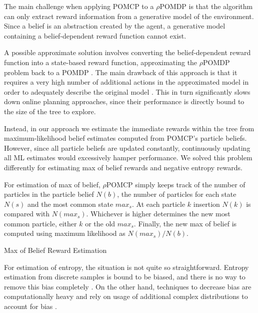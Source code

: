 The main challenge when applying POMCP to a $\rho$POMDP is that the algorithm can only extract
reward information from a generative model of the environment. Since a belief is an abstraction
created by the agent, a generative model containing a belief-dependent reward function cannot exist.

A possible approximate solution involves converting the belief-dependent reward function into a
state-based reward function, approximating the $\rho$POMDP problem back to a POMDP
\cite{cit:rpomdp}.  The main drawback of this approach is that it requires a very high number of
additional actions in the approximated model in order to adequately describe the original model
\cite{cit:pomdpir}. This in turn significantly slows down online planning approaches, since their
performance is directly bound to the size of the tree to explore.

Instead, in our approach we estimate the immediate rewards within the tree from maximum-likelihood
belief estimates computed from POMCP's particle beliefs. However, since all particle beliefs are
updated constantly, continuously updating all ML estimates would excessively hamper performance. We
solved this problem differently for estimating max of belief rewards and negative entropy rewards.

For estimation of max of belief, $\rho$POMCP simply keeps track of the number of particles in the
particle belief $N(b)$, the number of particles for each state $N(s)$ and the most common state
$max_s$. At each particle $k$ insertion $N(k)$ is compared with $N(max_s)$. Whichever is higher
determines the new most common particle, either $k$ or the old $max_s$. Finally, the new max of
belief is computed using maximum likelihood as $N(max_s)/N(b)$.

\begin{algorithm}[H]
    \caption{Max of Belief Reward Estimation}

\end{algorithm}

For estimation of entropy, the situation is not quite so straightforward. Entropy estimation from
discrete samples is bound to be biased, and there is no way to remove this bias completely
\cite{cit:badentropy}. On the other hand, techniques to decrease bias are computationally heavy and
rely on usage of additional complex distributions to account for bias \cite{cit:entropyfixes}.

